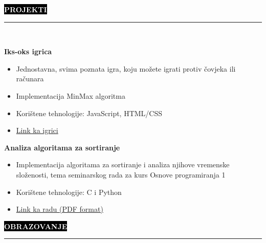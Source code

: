 \documentclass[9pt]{developercv} %
\begin{document}
\colorbox{black}{{\textcolor{white}{\textbf{\MakeUppercase{Projekti}}}}}
\par\noindent\rule{\textwidth}{2px}\\

\begin{minipage}[t]{0.45\textwidth}
	\vspace{-\baselineskip}
	
	{\textbf{Iks-oks igrica}}
	\begin{itemize}
        \item Jednostavna, svima poznata igra, koju možete igrati protiv čovjeka ili računara
        \item Implementacija MinMax algoritma
        \item Korištene tehnologije: JavaScript, HTML/CSS
        \item [\faExternalLink]{\href{https://github.com/vladocodes/noughts-and-crosses}{Link ka igrici}}
    \end{itemize}
\end{minipage}
\hfill
\begin{minipage}[t]{0.45\textwidth}
    \vspace{-\baselineskip}
    
    {\textbf{Analiza algoritama za sortiranje}}
    \begin{itemize}
        \item Implementacija algoritama za sortiranje i analiza njihove vremenske složenosti, tema seminarskog rada za kurs Osnove programiranja 1
        \item Korištene tehnologije: C i Python \smallskip \smallskip
        \item [\faExternalLink]{\href{https://drive.google.com/file/d/1wapk7Xp4A1X1ZIm_lr4ez-C7uIbK8DDp/view?usp=sharing}{Link ka radu (PDF format)}}
    \end{itemize}
\end{minipage}

\vspace{1cm}




\colorbox{black}{{\textcolor{white}{\textbf{\MakeUppercase{Obrazovanje}}}}}
\par\noindent\rule{\textwidth}{2px}\\
        
\end{document}
